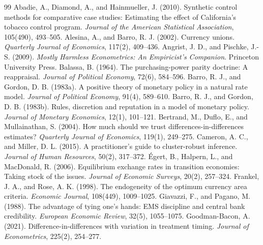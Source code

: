 \documentclass[11pt,a4paper]{article}
\numberwithin{equation}{section}
\theoremstyle{definition}
\theoremstyle{remark}
\begin{document}
\clearpage
\begin{thebibliography}{99}\small
{} Abadie, A., Diamond, A., and Hainmueller, J. (2010). Synthetic control methods for comparative case studies: Estimating the effect of California's tobacco control program. \textit{Journal of the American Statistical Association}, 105(490), 493--505.
 Alesina, A., and Barro, R. J. (2002). Currency unions. \textit{Quarterly Journal of Economics}, 117(2), 409--436.
 Angrist, J. D., and Pischke, J.-S. (2009). \textit{Mostly Harmless Econometrics: An Empiricist's Companion}. Princeton University Press.
 Balassa, B. (1964). The purchasing-power parity doctrine: A reappraisal. \textit{Journal of Political Economy}, 72(6), 584--596.
 Barro, R. J., and Gordon, D. B. (1983a). A positive theory of monetary policy in a natural rate model. \textit{Journal of Political Economy}, 91(4), 589--610.
 Barro, R. J., and Gordon, D. B. (1983b). Rules, discretion and reputation in a model of monetary policy. \textit{Journal of Monetary Economics}, 12(1), 101--121.
 Bertrand, M., Duflo, E., and Mullainathan, S. (2004). How much should we trust differences-in-differences estimates? \textit{Quarterly Journal of Economics}, 119(1), 249--275.
 Cameron, A. C., and Miller, D. L. (2015). A practitioner's guide to cluster-robust inference. \textit{Journal of Human Resources}, 50(2), 317--372.
 {\'E}gert, B., Halpern, L., and MacDonald, R. (2006). Equilibrium exchange rates in transition economies: Taking stock of the issues. \textit{Journal of Economic Surveys}, 20(2), 257--324.
 Frankel, J. A., and Rose, A. K. (1998). The endogeneity of the optimum currency area criteria. \textit{Economic Journal}, 108(449), 1009--1025.
 Giavazzi, F., and Pagano, M. (1988). The advantage of tying one's hands: EMS discipline and central bank credibility. \textit{European Economic Review}, 32(5), 1055--1075.
 Goodman-Bacon, A. (2021). Difference-in-differences with variation in treatment timing. \textit{Journal of Econometrics}, 225(2), 254--277.

\end{thebibliography}
\end{document}
